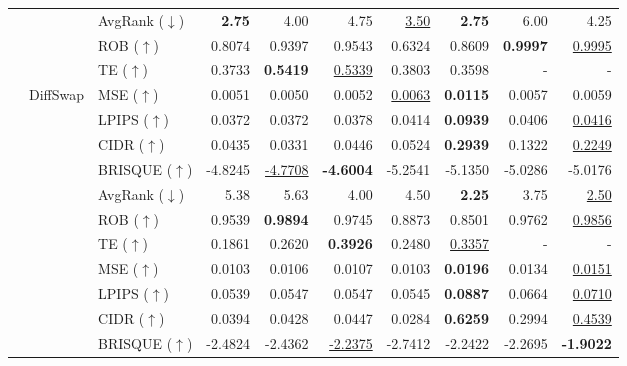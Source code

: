 \documentclass{article}
\begin{document}
\begin{table}[h!]
\begin{tabular}{lllrrrrrrr}
& & AvgRank ($\downarrow$) & \textbf{2.75} & 4.00 & 4.75 & \underline{3.50} & \textbf{2.75} & 6.00 & 4.25 \\

\cmidrule(lr){3-10}

& & ROB ($\uparrow$) & 0.8074 & 0.9397 & 0.9543 & 0.6324 & 0.8609 & \textbf{0.9997} & \underline{0.9995} \\
& & TE ($\uparrow$) & 0.3733 & \textbf{0.5419} & \underline{0.5339} & 0.3803 & 0.3598 & - & -\\

\cmidrule(lr){2-10}

& \multirow{9}{*}{DiffSwap}
& MSE ($\uparrow$) & 0.0051 & 0.0050 & 0.0052 & \underline{0.0063} & \textbf{0.0115} & 0.0057 & 0.0059 \\
& & LPIPS ($\uparrow$) & 0.0372 & 0.0372 & 0.0378 & 0.0414 & \textbf{0.0939} & 0.0406 & \underline{0.0416} \\
& & CIDR ($\uparrow$) & 0.0435 & 0.0331 & 0.0446 & 0.0524 & \textbf{0.2939} & 0.1322 & \underline{0.2249} \\
& & BRISQUE ($\uparrow$) & -4.8245 & \underline{-4.7708} & \textbf{-4.6004} & -5.2541 & -5.1350 & -5.0286 & -5.0176 \\
\cmidrule(lr){3-10}

& & AvgRank ($\downarrow$) & 5.38 & 5.63 & 4.00 & 4.50 & \textbf{2.25} & 3.75 & \underline{2.50} \\

\cmidrule(lr){3-10}

& & ROB ($\uparrow$) & 0.9539 & \textbf{0.9894} & 0.9745 & 0.8873 & 0.8501 & 0.9762 & \underline{0.9856} \\
& & TE ($\uparrow$) & 0.1861 & 0.2620 & \textbf{0.3926} & 0.2480 & \underline{0.3357} & - & -\\

\cmidrule(lr){2-10}

& \multirow{9}{*}{DiffFace}
& MSE ($\uparrow$) & 0.0103 & 0.0106 & 0.0107 & 0.0103 & \textbf{0.0196} & 0.0134 & \underline{0.0151} \\
& & LPIPS ($\uparrow$) & 0.0539 & 0.0547 & 0.0547 & 0.0545 & \textbf{0.0887} & 0.0664 & \underline{0.0710} \\
& & CIDR ($\uparrow$) & 0.0394 & 0.0428 & 0.0447 & 0.0284 & \textbf{0.6259} & 0.2994 & \underline{0.4539} \\
& & BRISQUE ($\uparrow$) & -2.4824 & -2.4362 & \underline{-2.2375} & -2.7412 & -2.2422 & -2.2695 & \textbf{-1.9022} \\
\cmidrule(lr){3-10}


\end{tabular}
\end{table}
\end{document}
